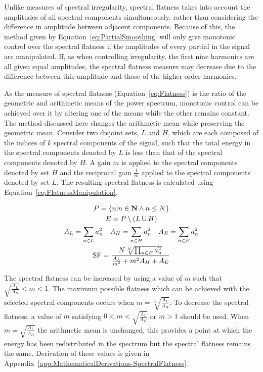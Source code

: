 		Unlike measures of spectral irregularity, spectral flatness takes into account the amplitudes of all
		spectral components simultaneously, rather than considering the difference in amplitude between adjacent
		components. Because of this, the method given by Equation~\ref{eq:PartialSmoothing} will only give
		monotonic control over the spectral flatness if the amplitudes of every partial in the signal are
		manipulated. If, as when controlling irregularity, the first nine harmonics are all given equal amplitudes,
		the spectral flatness measure may decrease due to the difference between this amplitude and those of the
		higher order harmonics.

		As the measure of spectral flatness (Equation~\ref{eq:Flatness}) is the ratio of the geometric and
		arithmetic means of the power spectrum, monotonic control can be achieved over it by altering one of the
		means while the other remains constant. The method discussed here changes the arithmetic mean while
		preserving the geometric mean. Consider two disjoint sets, $L$ and $H$, which are each composed of the
		indices of $k$ spectral components of the signal, such that the total energy in the spectral components
		denoted by $L$ is less than that of the spectral components denoted by $H$. A gain $m$ is applied to the
		spectral components denoted by set $H$ and the reciprocal gain $\frac{1}{m}$ applied to the spectral
		components denoted by set $L$. The resulting spectral flatness is calculated using
		Equation~\ref{eq:FlatnessManipulation}.

		\begin{gather}
			P = \left\{ n | n \in \textbf{N} \land n \leq N \right\} \nonumber \\
			E = P \setminus (L \medcup H) \nonumber \\
			A_{L} = \sum_{n \in L} a_{n}^{2} \quad A_{H} = \sum_{n \in H} a_{n}^{2}
			   \quad A_{E} = \sum_{n \in E} a_{n}^{2} \nonumber \\
			\mathrm{SF} = \frac{N\sqrt[N]{\prod_{n \in P} a_{n}^{2}}}
					   {\frac{A_{L}}{m^{2}} + m^{2}A_{H} + A_{E}}
			\label{eq:FlatnessManipulation}
		\end{gather}

		The spectral flatness can be increased by using a value of $m$ such that $\sqrt{\frac{A_{L}}{A_{H}}} < m <
		1$. The maximum possible flatness which can be achieved with the selected spectral components occurs when
		$m = \sqrt[4]{\frac{A_{L}}{A_{H}}}$. To decrease the spectral flatness, a value of $m$ satisfying $0 < m <
		\sqrt{\frac{A_{L}}{A_{H}}}$ or $m > 1$ should be used. When $m = \sqrt{\frac{A_{L}}{A_{H}}}$ the arithmetic
		mean is unchanged, this provides a point at which the energy has been redistributed in the spectrum but the
		spectral flatness remains the same. Derivation of these values is given in
		Appendix~\ref{app:MathematicalDerivations-SpectralFlatness}.

